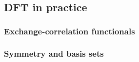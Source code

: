 




\subsection{DFT in practice}

\subsubsection{Exchange-correlation functionals}







\subsubsection{Symmetry and basis sets}


